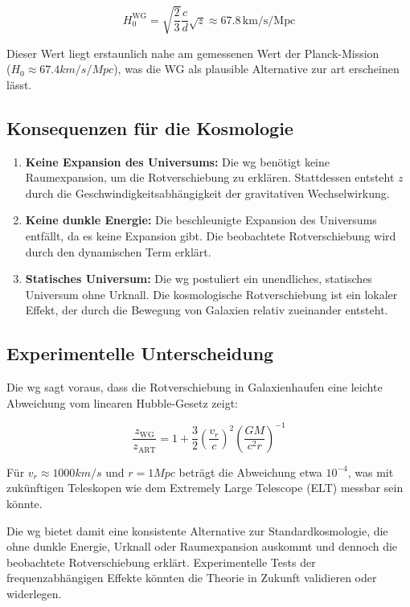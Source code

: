 \begin{equation}
    H_0^{\text{WG}} = \sqrt{\frac{2}{3}} \frac{c}{d} \sqrt{z} \approx 67.8 \, \text{km/s/Mpc}
\end{equation}

Dieser Wert liegt erstaunlich nahe am gemessenen Wert der Planck-Mission\\($H_0 \approx 67.4 km/s/Mpc$), was die WG als plausible Alternative zur \gls{art} erscheinen lässt.

\subsection{Konsequenzen für die Kosmologie}
\begin{enumerate}
    \item \textbf{Keine Expansion des Universums:} Die \gls{wg} benötigt keine Raumexpansion, um die Rotverschiebung zu erklären. Stattdessen entsteht $z$ durch die Geschwindigkeitsabhängigkeit der gravitativen Wechselwirkung.
    \item \textbf{Keine dunkle Energie:} Die beschleunigte Expansion des Universums entfällt, da es keine Expansion gibt. Die beobachtete Rotverschiebung wird durch den dynamischen Term erklärt.
    \item \textbf{Statisches Universum:} Die \gls{wg} postuliert ein unendliches, statisches Universum ohne Urknall. Die kosmologische Rotverschiebung ist ein lokaler Effekt, der durch die Bewegung von Galaxien relativ zueinander entsteht.
\end{enumerate}

\subsection{Experimentelle Unterscheidung}
Die \gls{wg} sagt voraus, dass die Rotverschiebung in Galaxienhaufen eine leichte Abweichung vom linearen Hubble-Gesetz zeigt:

\begin{equation}
    \frac{z_{\text{WG}}}{z_{\text{ART}}} = 1 + \frac{3}{2} \left( \frac{v_r}{c} \right)^2 \left( \frac{GM}{c^2 r} \right)^{-1}
\end{equation}

Für $v_r \approx 1000 km/s$ und $r = 1 Mpc$ beträgt die Abweichung etwa $10^{-4}$, was mit zukünftigen Teleskopen wie dem Extremely Large Telescope (ELT) messbar sein könnte.

Die \gls{wg} bietet damit eine konsistente Alternative zur Standardkosmologie, die ohne dunkle Energie, Urknall oder Raumexpansion auskommt und dennoch die beobachtete Rotverschiebung erklärt.
Experimentelle Tests der frequenzabhängigen Effekte könnten die Theorie in Zukunft validieren oder widerlegen.

